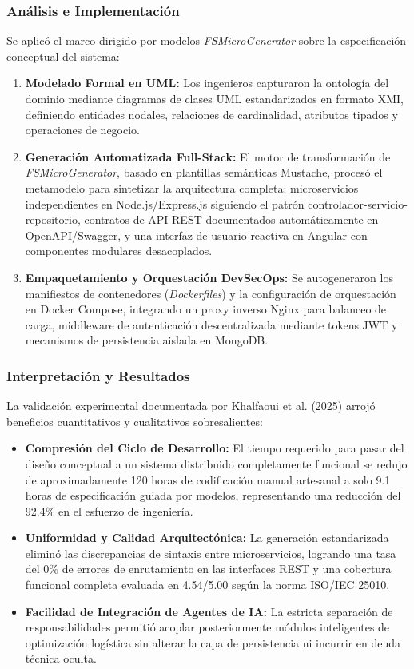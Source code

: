 \subsubsection*{Análisis e Implementación}
Se aplicó el marco dirigido por modelos \textit{FSMicroGenerator} sobre la especificación conceptual del sistema:
\begin{enumerate}
    \item \textbf{Modelado Formal en UML:} Los ingenieros capturaron la ontología del dominio mediante diagramas de clases UML estandarizados en formato XMI, definiendo entidades nodales, relaciones de cardinalidad, atributos tipados y operaciones de negocio.
    \item \textbf{Generación Automatizada Full-Stack:} El motor de transformación de \textit{FSMicroGenerator}, basado en plantillas semánticas Mustache, procesó el metamodelo para sintetizar la arquitectura completa: microservicios independientes en Node.js/Express.js siguiendo el patrón controlador-servicio-repositorio, contratos de API REST documentados automáticamente en OpenAPI/Swagger, y una interfaz de usuario reactiva en Angular con componentes modulares desacoplados.
    \item \textbf{Empaquetamiento y Orquestación DevSecOps:} Se autogeneraron los manifiestos de contenedores (\textit{Dockerfiles}) y la configuración de orquestación en Docker Compose, integrando un proxy inverso Nginx para balanceo de carga, middleware de autenticación descentralizada mediante tokens JWT y mecanismos de persistencia aislada en MongoDB.
\end{enumerate}

\subsubsection*{Interpretación y Resultados}
La validación experimental documentada por Khalfaoui et al. (2025) arrojó beneficios cuantitativos y cualitativos sobresalientes:
\begin{itemize}
    \item \textbf{Compresión del Ciclo de Desarrollo:} El tiempo requerido para pasar del diseño conceptual a un sistema distribuido completamente funcional se redujo de aproximadamente 120 horas de codificación manual artesanal a solo 9.1 horas de especificación guiada por modelos, representando una reducción del 92.4\% en el esfuerzo de ingeniería.
    \item \textbf{Uniformidad y Calidad Arquitectónica:} La generación estandarizada eliminó las discrepancias de sintaxis entre microservicios, logrando una tasa del 0\% de errores de enrutamiento en las interfaces REST y una cobertura funcional completa evaluada en 4.54/5.00 según la norma ISO/IEC 25010.
    \item \textbf{Facilidad de Integración de Agentes de IA:} La estricta separación de responsabilidades permitió acoplar posteriormente módulos inteligentes de optimización logística sin alterar la capa de persistencia ni incurrir en deuda técnica oculta.
\end{itemize}
